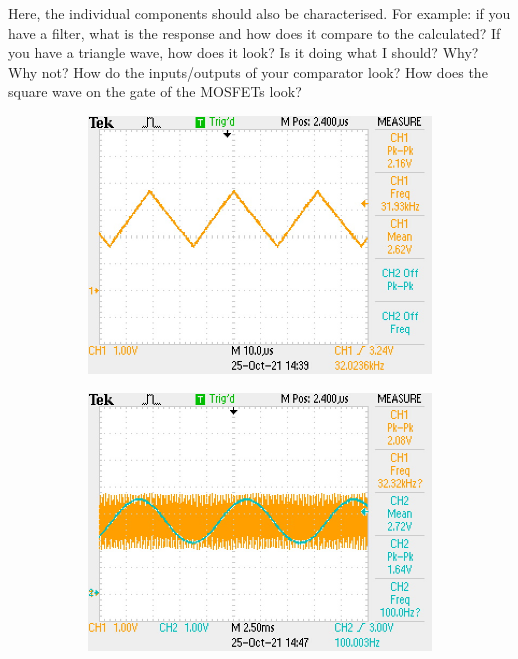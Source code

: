 \documentclass[a4paper,11pt]{article}
\begin{document}
Here, the individual components should also be characterised. For example: if you have a filter, what is the response and how does it compare to the calculated? If you have a triangle wave, how does it look? Is it doing what I should? Why? Why not? How do the inputs/outputs of your comparator look? How does the square wave on the gate of the MOSFETs look?


\begin{figure}[h!]
    \centering
    \begin{subfigure}{0.52\textwidth}
        \includegraphics[width=\columnwidth]{spwm/triangle_wave_32kHz.JPG}
        \subcaption{}
    \end{subfigure}
    \begin{subfigure}{0.48\textwidth}
        \includegraphics[width=\columnwidth]{spwm/input_sampling_0.JPG}

\end{subfigure}
\end{figure}
\end{document}
